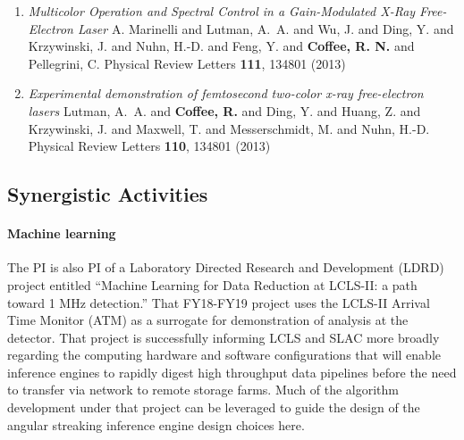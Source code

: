 \begin{enumerate}
\item \textit{Multicolor Operation and Spectral Control in a Gain-Modulated X-Ray Free-Electron Laser}
A. Marinelli and Lutman, {A.~A.} and Wu, J. and Ding, Y. and Krzywinski, J. and Nuhn, H.-D. and Feng, Y. and \textbf{Coffee, R. N.} and Pellegrini, C.
Physical Review Letters \textbf{111}, 134801 (2013)
\item \textit{Experimental demonstration of femtosecond two-color x-ray free-electron lasers}
Lutman, A.~A. and \textbf{Coffee, R.} and Ding, Y. and Huang, Z. and Krzywinski, J. and Maxwell, T. and Messerschmidt, M. and Nuhn, H.-D.
Physical Review Letters \textbf{110}, 134801 (2013)
\end{enumerate}


\subsection*{Synergistic Activities}

\paragraph*{Machine learning}

The PI is also PI of a Laboratory Directed Research and Development (LDRD) project entitled ``Machine Learning for Data Reduction at LCLS-II: a path toward 1 MHz detection.''
That FY18-FY19 project uses the LCLS-II Arrival Time Monitor (ATM) as a surrogate for demonstration of analysis at the detector.
That project is successfully informing LCLS and SLAC more broadly regarding the computing hardware and software configurations that will enable inference engines to rapidly digest high throughput data pipelines before the need to transfer via network to remote storage farms.
Much of the algorithm development under that project can be leveraged to guide the design of the angular streaking inference engine design choices here.




